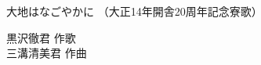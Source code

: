 \documentclass[10pt,b5j]{tarticle} %
\begin{document}
\begin{minipage}[c]{0.7\hsize} %
    \begin{center}
        {\LARGE
            大地はなごやかに %
        }
        {\small 
            （大正14年開舎20周年記念寮歌） %
        }
    \end{center}
\end{minipage}
\begin{minipage}[c]{0.3\hsize} %
    \begin{flushright} %
        黒沢徹君 作歌\\三溝清美君 作曲 %
    \end{flushright}
\end{minipage}
\end{document}
